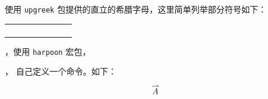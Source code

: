 使用 \verb|upgreek| 包提供的直立的希腊字母，这里简单列举部分符号如下：
\begin{center}
	\begin{tabular}{*4{ll}}
		\K{\upalpha}      & \K{\uptheta}      & \K{\uppi}         & \K{\upphi}        \\
		\K{\upbeta}       & \K{\upvartheta}   & \K{\upvarpi}      & \K{\upvarphi}     \\
		\K{\upgamma }     & \K{\upiota}       & \K{\uprho}        & \K{\upchi}        \\
		\K{\updelta}      & \K{\upkappa}      & \K{\upvarrho}     & \K{\uppsi}        \\
	\end{tabular}
\end{center}



，使用 \verb|harpoon| 宏包，
\begin{example}
\end{example}



，
自己定义一个命令。如下：
\begin{example}
\newcommand{\myvec}[1]%
{\stackrel{\raisebox{-2pt}[0pt][0pt]
		{\small$\rightharpoonup$}}{#1}}
\[
	\myvec{A}
\]
\end{example}

